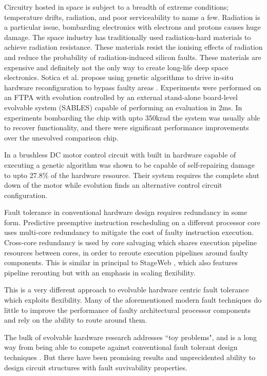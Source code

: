 Circuitry hosted in space is subject to a breadth of extreme conditions; temperature
drifts, radiation, and poor serviceability to name a few. Radiation is a particular
issue, bombarding electronics with electrons and protons causes huge damage.
The space industry has traditionally used radiation-hard materials to achieve
radiation resistance. These materials resist the ionising effects of radiation
and reduce the probability of radiation-induced silicon faults. These materials
are expensive and definitely not the only way to create long-life deep space
electronics. Sotica et al. propose using genetic algorithms to drive
in-situ hardware reconfiguration to bypass faulty areas \cite{1331112}. Experiments
were performed on an FTPA with evolution controlled by an external stand-alone
board-level evolvable system (SABLES) capable of performing an evaluation in 2ms.
In experiments bombarding the chip with upto 350krad the system was usually able
to recover functionality, and there were significant performance improvements over
the unevolved comparison chip.

In \cite{8046381} a brushless DC motor control circuit with built in hardware capable of executing
a genetic algorithm was shown to be capable of self-repairing damage to upto 27.8\%
of the hardware resource. Their system requires the complete shut down of the motor while
evolution finds an alternative control circuit configuration.

Fault tolerance in conventional hardware design requires redundancy in some
form. Predictive preemptive instruction rescheduling on a different processor
core \cite{Soman} uses multi-core redundancy to mitigate the cost of faulty instruction
execution. Cross-core redundancy is used by core salvaging \cite{Powell} which shares execution
pipeline resources between cores, in order to reroute execution pipelines
around faulty components. This is similar in principal to StageWeb \cite{StageWeb}, which also
features pipeline rerouting but with an emphasis in scaling flexibility.

This is a very different approach to evolvable hardware centric fault
tolerance which exploits flexibility. Many of the aforementioned modern
fault techniques do little to improve the performance of faulty architectural
processor components and rely on the ability to route around them.

The bulk of evolvable hardware research addresses ``toy problems", and is a long
way from being able to compete against conventional fault tolerant design
techniques \cite{4291951}. But there have been promising results and unprecidented
ability to design circuit structures with fault suvivability properties.
